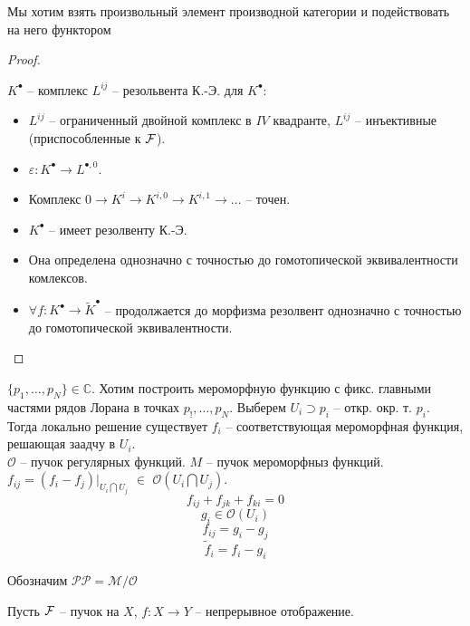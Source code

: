 \documentclass[../main.tex]{subfiles}
\begin{document}
Мы хотим взять произвольный элемент производной категории и подействовать на него функтором 
\begin{proof}
\begin{to_def}
$K^\bullet$ -- комплекс $L^{ij}$ -- резольвента К.-Э. для $K^\bullet$:
\begin{itemize}
    \item $L^{ij}$ -- ограниченный двойной комплекс в $IV$ квадранте, $L^{ij}$ -- инъективные (приспособленные к $\mathcal{F}$).
    \item $\varepsilon\colon K^\bullet \to L^{\bullet, 0}$.
    \item Комплекс $0 \to K^i \to K^{i, 0} \to K^{i, 1}\to \ldots$ -- точен.
\end{itemize}
\end{to_def}
\begin{to_thr}
\begin{itemize}
    \item $K^\bullet$ -- имеет резолвенту К.-Э.
    \item Она определена однозначно с точностью до гомотопической эквивалентности комлексов.
    \item $\forall f\colon K^\bullet \to \tilde{K}^\bullet$ -- продолжается до морфизма резолвент однозначно с точностью до гомотопической эквивалентности. 
\end{itemize}
\end{to_thr}
\end{proof}
\begin{to_suj}
$\lbrace p_1, \ldots, p_N\rbrace \in \mathbb{C}$. Хотим построить мероморфную функцию с фикс. главными частями рядов Лорана в точках $p_!, \ldots, p_N$. Выберем $U_i \supset p_i$ -- откр. окр. т. $p_i$. Тогда локально решение существует $f_i$ -- соответствующая мероморфная функция, решающая заадчу в $U_i$.\\
$\mathcal{O}$ -- пучок регулярных функций. $M$ -- пучок мероморфныз функций. $f_{ij} = (f_i - f_j)\vert_{U_i\bigcap U_j}$ $\in$ $\mathcal{O}(U_i\bigcap U_j)$.
\[ f_{ij} + f_{jk} + f_{ki} = 0\]
\[
g_i \in \mathcal{O}(U_i)
\]
\[f_{ij} = g_i - g_j\]
\[\tilde{f}_i = f_i - g_i\]
\end{to_suj}
Обозначим $\mathcal{PP} = \mathcal{M}/\mathcal{O}$
\bee
{}
\eee
Пусть $\mathcal{F}$ -- пучок на $X$, $f\colon X \to Y$ -- непрерывное отображение. 
\end{document}
